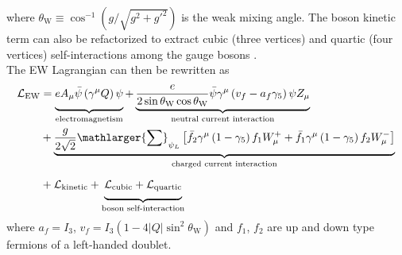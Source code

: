 \documentclass[../thesis.tex]{subfiles}
\begin{document}
where $\theta_\text{W}\equiv\cos^{-1}\left(g/\sqrt{g^2+g'^2}\right)$ is the weak mixing angle. The boson kinetic term can also be refactorized to extract cubic (three vertices) and quartic (four vertices) self-interactions among the gauge bosons \citep{theory:ew}.\\
The \acs{EW} Lagrangian can then be rewritten as
\begin{equation}
\begin{aligned}
\mathcal{L}_\text{EW} &=
\underbrace{\vphantom{\displaystyle\frac{e}{2\sin\theta_\text{W}}}
eA_\mu\bar{\psi}\left(\gamma^\mu Q\right)\psi
}_\text{electromagnetism}
+\underbrace{
\displaystyle\frac{e}{2\sin\theta_\text{W}\cos\theta_\text{W}}\bar{\psi}\gamma^\mu\left(v_f-a_f\gamma_5 \right)\psi Z_\mu
}_\text{neutral current interaction} \\
&+\underbrace{
\displaystyle\frac{g}{2\sqrt{2}}\mathlarger{\sum}_{\psi_L}
\left[ \bar{f}_2\gamma^\mu\left(1-\gamma_5\right)f_1 W_\mu^+ + \bar{f}_1\gamma^\mu\left(1-\gamma_5\right)f_2 W_\mu^- \right]
}_\text{charged current interaction} \\
&+\mathcal{L}_\text{kinetic}+\underbrace{\vphantom{\frac{1}{4}}
\mathcal{L}_\text{cubic}+\mathcal{L}_\text{quartic}
}_\text{boson self-interaction}
\end{aligned}
\end{equation}
where $a_f=I_3$, $v_f=I_3(1-4|Q|\sin^2\theta_\text{W})$ and $f_1$, $f_2$ are up and down type fermions of a left-handed doublet.
\end{document}
